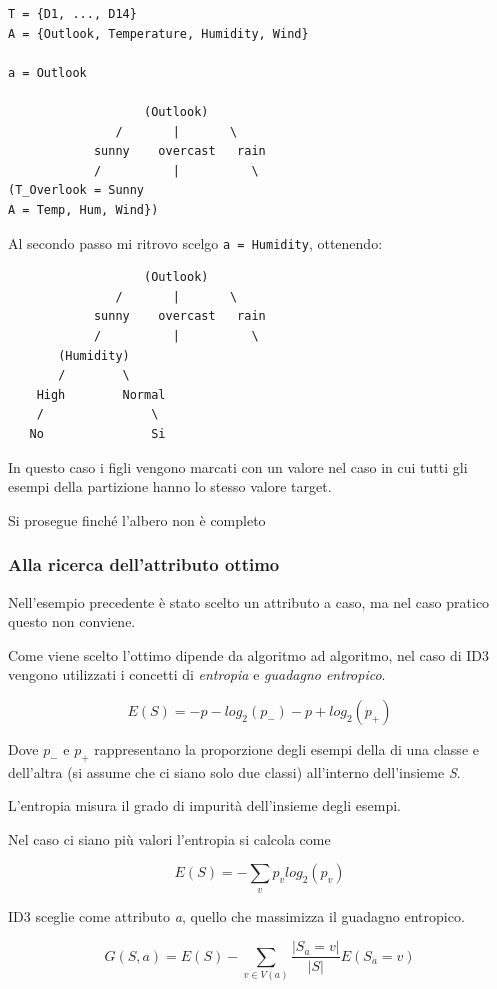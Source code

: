 \begin{verbatim}
T = {D1, ..., D14}
A = {Outlook, Temperature, Humidity, Wind}

a = Outlook

                   (Outlook)
               /       |       \
            sunny    overcast   rain
            /          |          \
(T_Overlook = Sunny
A = Temp, Hum, Wind})
\end{verbatim}

Al secondo passo mi ritrovo scelgo \texttt{a\ =\ Humidity}, ottenendo:

\begin{verbatim}
                   (Outlook)
               /       |       \
            sunny    overcast   rain
            /          |          \
       (Humidity)
       /        \
    High        Normal
    /               \
   No               Si
\end{verbatim}

In questo caso i figli vengono marcati con un valore nel
caso in cui tutti gli esempi della partizione hanno lo stesso valore
target.

Si prosegue finché l'albero non è completo

\subsubsection{Alla ricerca dell'attributo ottimo}\label{alla-ricerca-dellattributo-ottimo}

Nell'esempio precedente è stato scelto un attributo a caso, ma nel caso
pratico questo non conviene.

Come viene scelto l'ottimo dipende da algoritmo ad algoritmo, nel caso
di ID3 vengono utilizzati i concetti di \emph{entropia} e \emph{guadagno
entropico}.

$$
E(S) = -p-log_2(p_-) -p+log_2(p_+)
$$

Dove $p_-$ e $p_+$ rappresentano la proporzione degli esempi della di una
classe e dell'altra (si assume che ci siano solo due classi) all'interno
dell'insieme \textit{S}.

L'entropia misura il grado di impurità dell'insieme degli esempi.

Nel caso ci siano più valori l'entropia si calcola come

$$
E(S) = - \sum_v p_vlog_2(p_v)
$$

ID3 sceglie come attributo \emph{a}, quello che massimizza il guadagno
entropico.

$$
G(S,a) = E(S) - \sum_{v \in V(a)} \frac{|S_a = v|}{|S|} E(S_a=v)
$$

